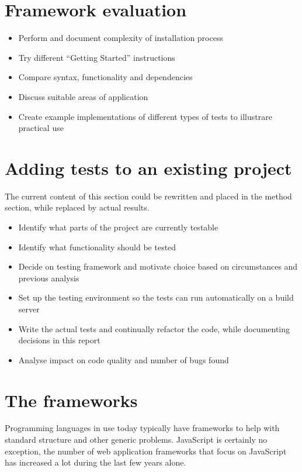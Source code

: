 \documentclass[11pt]{article}
\begin{document}
\section{Framework evaluation}

\begin{itemize}
  \item Perform and document complexity of installation process
  \item Try different ``Getting Started'' instructions
  \item Compare syntax, functionality and dependencies
  \item Discuss suitable areas of application
  \item Create example implementations of different types of tests to illustrare practical use
\end{itemize}

\section{Adding tests to an existing project}

The current content of this section could be rewritten and placed in the method section, while replaced by actual results.

\begin{itemize}
  \item Identify what parts of the project are currently testable
  \item Identify what functionality should be tested
  \item Decide on testing framework and motivate choice based on circumstances and previous analysis
  \item Set up the testing environment so the tests can run automatically on a build server
  \item Write the actual tests and continually refactor the code, while documenting decisions in this report
  \item Analyse impact on code quality and number of bugs found
\end{itemize}

\section{The frameworks}

Programming languages in use today typically have frameworks to help with standard structure and other generic problems. JavaScript is certainly no exception, the number of web application frameworks that focus on JavaScript has increased a lot during the last few years alone.
\end{document}
